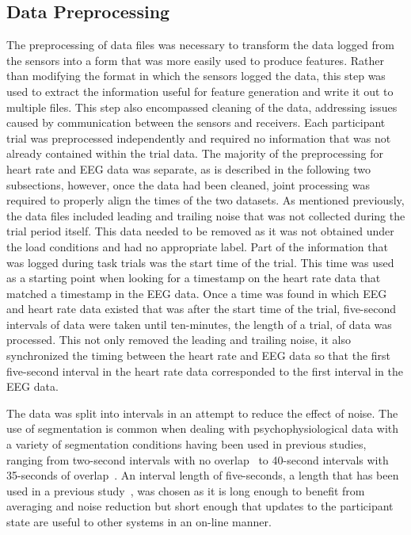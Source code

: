 \documentclass[11pt]{article}
\begin{document}
	\subsection{Data Preprocessing}
	The preprocessing of data files was necessary to transform the data logged from the sensors into a form that was more easily used to produce features. Rather than modifying the format in which the sensors logged the data, this step was used to extract the information useful for feature generation and write it out to multiple files. This step also encompassed cleaning of the data, addressing issues caused by communication between the sensors and receivers. Each participant trial was preprocessed independently and required no information that was not already contained within the trial data. The majority of the preprocessing for heart rate and EEG data was separate, as is described in the following two subsections, however, once the data had been cleaned, joint processing was required to properly align the times of the two datasets. As mentioned previously, the data files included leading and trailing noise that was not collected during the trial period itself. This data needed to be removed as it was not obtained under the load conditions and had no appropriate label. Part of the information that was logged during task trials was the start time of the trial. This time was used as a starting point when looking for a timestamp on the heart rate data that matched a timestamp in the EEG data. Once a time was found in which EEG and heart rate data existed that was after the start time of the trial, five-second intervals of data were taken until ten-minutes, the length of a trial, of data was processed. This not only removed the leading and trailing noise, it also synchronized the timing between the heart rate and EEG data so that the first five-second interval in the heart rate data corresponded to the first interval in the EEG data.
	
	The data was split into intervals in an attempt to reduce the effect of noise. The use of segmentation is common when dealing with psychophysiological data with a variety of segmentation conditions having been used in previous studies, ranging from two-second intervals with no overlap~\cite{Smith} to 40-second intervals with 35-seconds of overlap~\cite{Wang_Z}. An interval length of five-seconds, a length that has been used in a previous study~\cite{Yin}, was chosen as it is long enough to benefit from averaging and noise reduction but short enough that updates to the participant state are useful to other systems in an on-line manner. 
	
\end{document}
